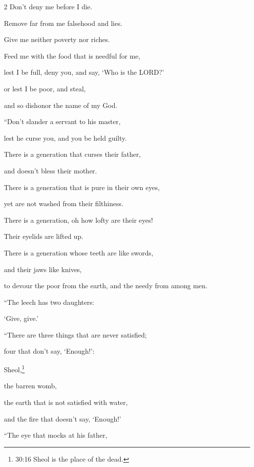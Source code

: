 \begin{multicols}{2}
Don’t deny me before I die.


\myverse{}Remove far from me falsehood and lies.

Give me neither poverty nor riches.

Feed me with the food that is needful for me,


\myverse{}lest I be full, deny you, and say, ‘Who is the LORD?’

or lest I be poor, and steal,

and so dishonor the name of my God.


\vspace{\baselineskip} 
\myverse{}“Don’t slander a servant to his master,

lest he curse you, and you be held guilty.


\vspace{\baselineskip} 
\myverse{}There is a generation that curses their father,

and doesn’t bless their mother.


\myverse{}There is a generation that is pure in their own eyes,

yet are not washed from their filthiness.


\myverse{}There is a generation, oh how lofty are their eyes!

Their eyelids are lifted up.


\myverse{}There is a generation whose teeth are like swords,

and their jaws like knives,

to devour the poor from the earth, and the needy from among men.


\vspace{\baselineskip} 
\myverse{}“The leech has two daughters:

‘Give, give.’

\vspace{\baselineskip} 
“There are three things that are never satisfied;

four that don’t say, ‘Enough!’:


\myverse{}Sheol,\footnote{30:16 Sheol is the place of the dead.}

the barren womb,

the earth that is not satisfied with water,

and the fire that doesn’t say, ‘Enough!’


\vspace{\baselineskip} 
\myverse{}“The eye that mocks at his father,


\end{multicols}
